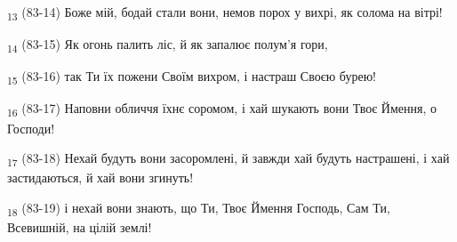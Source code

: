 \begin{tcolorbox}
\textsubscript{13} (83-14) Боже мій, бодай стали вони, немов порох у вихрі, як солома на вітрі!
\end{tcolorbox}
\begin{tcolorbox}
\textsubscript{14} (83-15) Як огонь палить ліс, й як запалює полум'я гори,
\end{tcolorbox}
\begin{tcolorbox}
\textsubscript{15} (83-16) так Ти їх пожени Своїм вихром, і настраш Своєю бурею!
\end{tcolorbox}
\begin{tcolorbox}
\textsubscript{16} (83-17) Наповни обличчя їхнє соромом, і хай шукають вони Твоє Ймення, о Господи!
\end{tcolorbox}
\begin{tcolorbox}
\textsubscript{17} (83-18) Нехай будуть вони засоромлені, й завжди хай будуть настрашені, і хай застидаються, й хай вони згинуть!
\end{tcolorbox}
\begin{tcolorbox}
\textsubscript{18} (83-19) і нехай вони знають, що Ти, Твоє Ймення Господь, Сам Ти, Всевишній, на цілій землі!
\end{tcolorbox}
